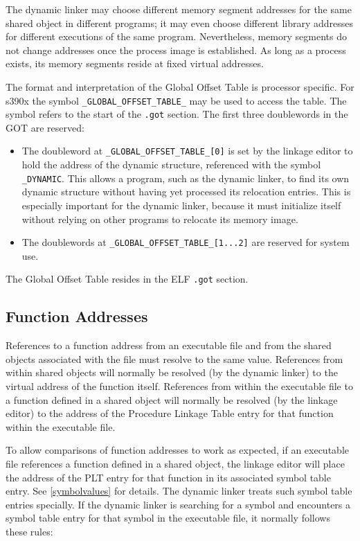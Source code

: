 \documentclass[USenglish,fontsize=11pt,twoside,%
  toc=bib,toc=idx,toc=graduated,numbers=noendperiod,
  bookmarks=true,
  bookmarksnumbered=true,
  bookmarksopen=true,
  bookmarksopenlevel=1,
  breaklinks=true,
  colorlinks=true,
  linkcolor=black,
  pdfpagelayout={TwoPageRight},
  pdfusetitle=true
]{scrreprt}
\newcommand{\ABINAME}{s390x}
\newcommand{\ABINAME}{s390}
\begin{document}
The dynamic linker may choose different memory segment addresses for
the same shared object in different programs; it may even choose
different library addresses for different executions of the same
program.  Nevertheless, memory segments do not change addresses once
the process image is established.  As long as a process exists, its
memory segments reside at fixed virtual addresses.

The format and interpretation of the Global Offset Table is processor
specific.  For \ABINAME{} the symbol \texttt{\_GLOBAL\_OFFSET\_TABLE\_}
may be used to access the table.  The symbol refers to the start of the
\texttt{.got} section.  The first three \ifzseries double\fi words in the
GOT are reserved:
\begin{itemize}
\item The \ifzseries double\fi word at
  \texttt{\_GLOBAL\_OFFSET\_TABLE\_[0]} is set by the linkage editor to
  hold the address of the dynamic structure, referenced with the symbol
  \texttt{\_DYNAMIC}.  This allows a program, such as the dynamic linker,
  to find its own dynamic structure without having yet processed its
  relocation entries.  This is especially important for the dynamic
  linker, because it must initialize itself without relying on other
  programs to relocate its memory image.
\item The \ifzseries double\fi words at
  \texttt{\_GLOBAL\_OFFSET\_TABLE\_[1...2]} are reserved for system use.
\end{itemize}

The Global Offset Table resides in the ELF \texttt{.got} section.

\subsection{Function Addresses}
\label{functionaddresses}
References to a function address from an executable file and from the
shared objects associated with the file must resolve to the same
value.  References from within shared objects will normally be resolved
(by the dynamic linker) to the virtual address of the function itself.
References from within the executable file to a function defined in a
shared object will normally be resolved (by the linkage editor) to the
address of the Procedure Linkage Table entry for that function within
the executable file.

To allow comparisons of function addresses to work as expected, if an
executable file references a function defined in a shared object, the
linkage editor will place the address of the PLT entry for that
function in its associated symbol table entry.  See
\cref{symbolvalues} for details.  The dynamic linker treats
such symbol table entries specially.  If the dynamic linker is
searching for a symbol and encounters a symbol table entry for that
symbol in the executable file, it normally follows these rules:
\end{document}
